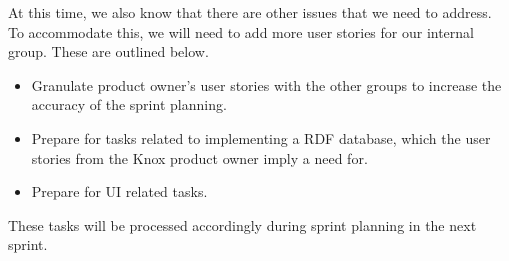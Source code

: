 At this time, we also know that there are other issues that we need to address. To accommodate this, we will need to add more user stories for our internal group. These are outlined below.

\begin{itemize}
    \item Granulate product owner's user stories with the other \knox{} groups to increase the accuracy of the sprint planning.
    \item Prepare for tasks related to implementing a RDF database, which the user stories from the Knox product owner imply a need for.
    \item Prepare for UI related tasks.
\end{itemize}

These tasks will be processed accordingly during sprint planning in the next sprint.